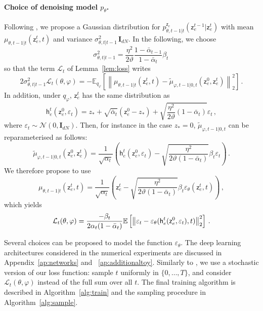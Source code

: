 \documentclass{article}
\theoremstyle{plain}
\theoremstyle{definition}
\theoremstyle{remark}
\newcommand{\latentcont}{\mathsf{z}_e}
\newcommand{\latentcontpred}{\mathsf{h}_e}
\begin{document}
\paragraph{Choice of denoising model $p_\theta$.}
Following \cite{ho2020denoising}, we propose a Gaussian distribution for $p_{\theta,t-1|t}^{\latentcont}(\latentcont^{t-1}|\latentcont^{t})$ with mean $\mu_{\theta,t-1|t}(\latentcont^{t},t)$ and variance $\sigma_{\theta,t|t-1}^2\,\mathbf{I}_{dN}$. In the following, we choose $$
\sigma_{\theta,t|t-1}^2 = \frac{\eta^2}{2\vartheta}\frac{1- \bar \alpha_{t-1}}{1- \bar \alpha_{t}}\beta_t\,
$$
so that the term $\mathcal{L}_t$ of Lemma~\ref{lem:loss} writes
$$
    2\sigma_{\theta,t|t-1}^2\mathcal{L}_t(\theta,\varphi)   = -\mathbb{E}_{q_\varphi}\left[\left\|\mu_{\theta,t-1|t}(\latentcont^{t},t) -  \tilde \mu_{\varphi,t-1|0,t}(\latentcont^0,\latentcont^t)\right\|_2^2\right]\,.
$$
In addition, under $q_\varphi$, $\latentcont^t$ has the same distribution as
$$
\latentcontpred^t(\latentcont^{0},\varepsilon_t) = z_* + \sqrt{\bar \alpha_t}(\latentcont^{0}-z_*) + \sqrt{\frac{\eta^2}{2\vartheta}(1-\bar\alpha_t)}\varepsilon_t\,,
$$
where $\varepsilon_t \sim \mathcal{N}(0,\mathbf{I}_{dN})$. Then, for instance in the case $z_*=0$, $\tilde \mu_{\varphi,t-1|0,t}$ can be reparameterised as follows:
$$
    \tilde \mu_{\varphi,t-1|0,t}(\latentcont^0,\latentcont^t) =  \frac{1}{\sqrt{\alpha_t}}\left(\latentcontpred^t(\latentcont^0,\varepsilon_t) - \sqrt{\frac{\eta^2}{2\vartheta (1-\bar{\alpha}_t)}}\beta_t\varepsilon_t\right)\,.
$$
We therefore propose to use
$$
    \mu_{\theta,t-1|t}(\latentcont^{t},t) =
     \frac{1}{\sqrt{\alpha_t}}\left(\latentcont^t - \sqrt{\frac{\eta^2}{2\vartheta (1-\bar{\alpha}_t)}}\beta_t\varepsilon_\theta(\latentcont^{t},t)\right)\,,
$$
which yields
\begin{equation}
    \label{eq:hoparam}
    \mathcal{L}_t(\theta,\varphi) \\
    = \frac{-\beta_t}{2\alpha_t(1-\bar\alpha_t)}\mathbb{E}\left[\left\|\varepsilon_t - \varepsilon_\theta(\latentcontpred^t(\latentcont^{0},\varepsilon_t) ,t) \right\|_2^2\right]\,.
\end{equation}
    
Several choices can be proposed to model the function $\varepsilon_\theta$. The deep learning architectures considered in the numerical experiments are discussed in Appendix~\ref{ap:networks} and ~\ref{ap:additionaltoy}. Similarly to \cite{ho2020denoising}, we use a stochastic version of our loss function:  sample $t$ uniformly in $\{0, \ldots,  T\}$, and consider $\mathcal{L}_t(\theta,\varphi)$ instead of the full sum over all $t$. The final training algorithm is described in Algorithm~\ref{alg:train} and the sampling procedure in Algorithm~\ref{alg:sample}. 
\end{document}
